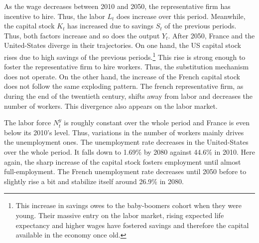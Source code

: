 As the wage decreases between 2010 and 2050, the representative firm has incentive to hire. Thus, the labor $L_t$ does increase over this period. Meanwhile, the capital stock $K_t$ has increased due to savings $S_t$ of the previous periods. Thus, both factors increase and so does the output $Y_t$. After 2050, France and the United-States diverge in their trajectories. On one hand, the US capital stock rises due to high savings of the previous periods.\footnote{This increase in savings owes to the baby-boomers cohort when they were young. Their massive entry on the labor market, rising expected life expectancy and higher wages have fostered savings and therefore the capital available in the economy once old.} This rise is strong enough to foster the representative firm to hire workers. Thus, the substitution mechanism does not operate. On the other hand, the increase of the French capital stock does not follow the same exploding pattern. The french representative firm, as during the end of the twentieth century, shifts away from labor and decreases the number of workers. This divergence also appears on the labor market.

The labor force $N^y_t$ is roughly constant over the whole period and France is even below its 2010's level. Thus, variations in the number of workers mainly drives the unemployment ones. The unemployment rate decreases in the United-States over the whole period. It falls down to 1.69\% by 2080 against 44.6\% in 2010. Here again, the sharp increase of the capital stock fosters employment until almost full-employment. The French unemployment rate decreases until 2050 before to slightly rise a bit and stabilize itself around 26.9\% in 2080.

